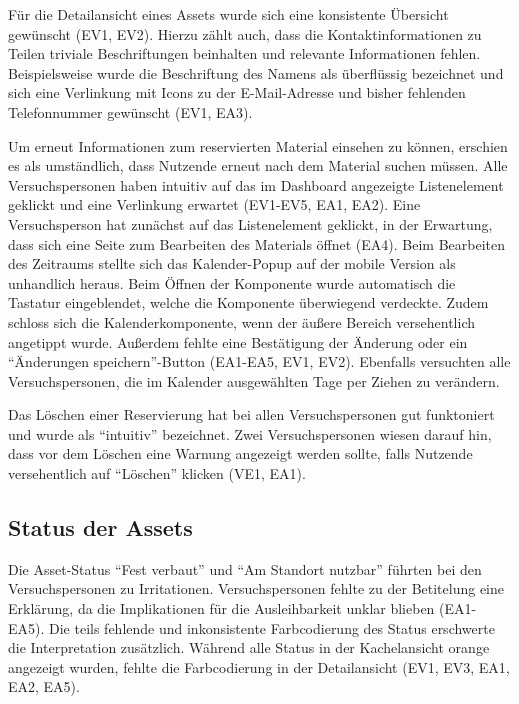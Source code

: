 Für die Detailansicht eines Assets wurde sich eine konsistente Übersicht gewünscht (EV1, EV2).
Hierzu zählt auch, dass die Kontaktinformationen zu Teilen triviale Beschriftungen beinhalten und
relevante Informationen fehlen. Beispielsweise wurde die Beschriftung des Namens als überflüssig
bezeichnet und sich eine Verlinkung mit Icons zu der E-Mail-Adresse und bisher fehlenden
Telefonnummer gewünscht (EV1, EA3).

Um erneut Informationen zum reservierten Material einsehen zu können, erschien es als umständlich,
dass Nutzende erneut nach dem Material suchen müssen. Alle Versuchspersonen haben intuitiv auf das
im Dashboard angezeigte Listenelement geklickt und eine Verlinkung erwartet (EV1-EV5, EA1, EA2).
Eine Versuchsperson hat zunächst auf das Listenelement geklickt, in der Erwartung, dass sich eine
Seite zum Bearbeiten des Materials öffnet (EA4). Beim Bearbeiten des Zeitraums stellte sich das
Kalender-Popup auf der mobile Version als unhandlich heraus. Beim Öffnen der Komponente wurde
automatisch die Tastatur eingeblendet, welche die Komponente überwiegend verdeckte. Zudem schloss
sich die Kalenderkomponente, wenn der äußere Bereich versehentlich angetippt wurde. Außerdem
fehlte eine Bestätigung der Änderung oder ein \enquote{Änderungen speichern}-Button (EA1-EA5, EV1,
EV2). Ebenfalls versuchten alle Versuchspersonen, die im Kalender ausgewählten Tage per Ziehen
zu verändern.

Das Löschen einer Reservierung hat bei allen Versuchspersonen gut funktoniert und wurde als
\enquote{intuitiv} bezeichnet. Zwei Versuchspersonen wiesen darauf hin, dass vor dem Löschen eine
Warnung angezeigt werden sollte, falls Nutzende versehentlich auf \enquote{Löschen} klicken (VE1,
EA1).


\subsection{Status der Assets}
Die Asset-Status \enquote{Fest verbaut} und \enquote{Am Standort nutzbar} führten bei den
Versuchspersonen zu Irritationen. Versuchspersonen fehlte zu der Betitelung eine Erklärung, da die
Implikationen für die Ausleihbarkeit unklar blieben (EA1-EA5). Die teils fehlende und inkonsistente
Farbcodierung des Status erschwerte die Interpretation zusätzlich. Während alle Status in der
Kachelansicht orange angezeigt wurden, fehlte die Farbcodierung in der Detailansicht (EV1, EV3, EA1,
EA2, EA5).

